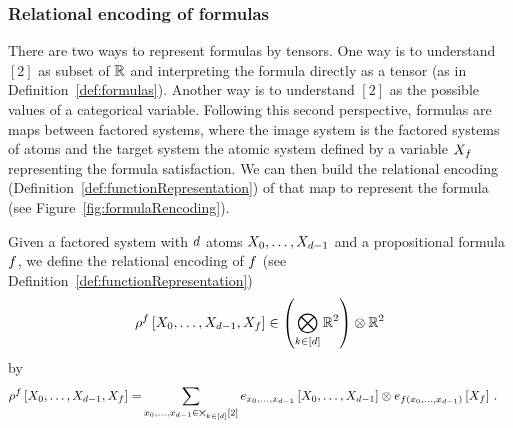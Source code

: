 %	


\subsubsection{Relational encoding of formulas}


There are two ways to represent formulas by tensors.
One way is to understand $[2]$ as subset of $\mathbb{R}$ and interpreting the formula directly as a tensor (as in Definition~\ref{def:formulas}).
Another way is to understand $[2]$ as the possible values of a categorical variable.
Following this second perspective, formulas are maps between factored systems, where the image system is the factored systems of atoms and the target system the atomic system defined by a variable $X_{f}$ representing the formula satisfaction.
We can then build the relational encoding (Definition~\ref{def:functionRepresentation}) of that map to represent the formula (see Figure~\ref{fig:formulaRencoding}).

\begin{definition} %
	Given a factored system with $d$ atoms $X_{0},\ldots,X_{d-1}$ and a propositional formula $f$, we define the relational encoding of $f$ (see Definition~\ref{def:functionRepresentation}) 
		\[ \rho^{f}\left[X_{0},\ldots,X_{d-1},X_{f}\right] \in  \left(\bigotimes_{k\in[d]} \mathbb{R}^2\right) \otimes \mathbb{R}^2 \]
	by 
	\begin{align} 
		\rho^{f}\left[X_{0},\ldots,X_{d-1},X_{f}\right] 
		= & \sum_{{x_{0},\ldots,x_{d-1}}\in\bigtimes_{k\in[d]}[2]}  e_{{x_{0},\ldots,x_{d-1}}}\left[X_{0},\ldots,X_{d-1}\right] \otimes e_{f({x_{0},\ldots,x_{d-1}})}\left[X_{f}\right] \, . 
	\end{align}
\end{definition}

